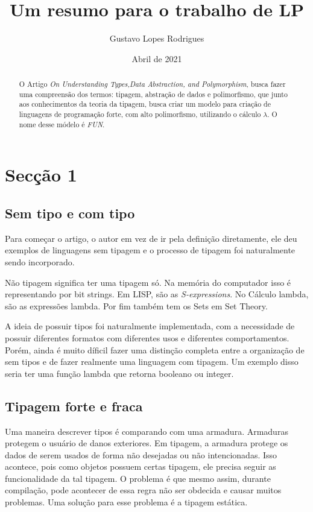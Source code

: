 \documentclass[12pt]{article}
\title{\textbf{Um resumo para o trabalho de LP}}
\author{Gustavo Lopes Rodrigues}
\date{Abril de 2021}
\begin{document}
    
    \maketitle

    \begin{abstract}
        O Artigo \emph{On Understanding Types,Data Abstraction, and Polymorphism}, busca fazer uma compreensão
        dos termos: tipagem, abstração de dados e polimorfismo, que junto aos conhecimentos da teoria da tipagem,
        busca criar um modelo para criação de linguagens de programação forte, com alto polimorfismo, utilizando o
        cálculo $\lambda$. O nome desse módelo é \emph{FUN}.
    \end{abstract}

    \section{Secção 1}
    \subsection{Sem tipo e com tipo}

        Para começar o artigo, o autor em vez de ir pela definição diretamente, ele 
        deu exemplos de linguagens sem tipagem e o processo de tipagem foi naturalmente
        sendo incorporado.

        Não tipagem significa ter uma tipagem só. Na memória do computador isso é representando por 
        bit strings. Em LISP, são as \emph{S-expressions}. No Cálculo lambda, são as expressões lambda. Por fim
        também tem os Sets em Set Theory. 

        A ideia de possuir tipos foi naturalmente implementada, com a necessidade de possuir diferentes 
        formatos com diferentes usos e diferentes comportamentos. Porém, ainda é muito díficil fazer uma distinção completa 
        entre a organização de sem tipos e de fazer realmente uma linguagem com tipagem. Um exemplo disso seria ter uma função 
        lambda que retorna booleano ou integer.

    \subsection{Tipagem forte e fraca}

        Uma maneira descrever tipos é comparando com uma armadura. Armaduras protegem o usuário de danos
        exteriores. Em tipagem, a armadura protege os dados de serem usados de forma não desejadas ou não
        intencionadas. Isso acontece, pois como objetos possuem certas tipagem, ele precisa seguir as 
        funcionalidade da tal tipagem. O problema é que mesmo assim, durante compilação, pode acontecer de
        essa regra não ser obdecida e causar muitos problemas. Uma solução para esse problema é a tipagem estática. 
        
\end{document}
